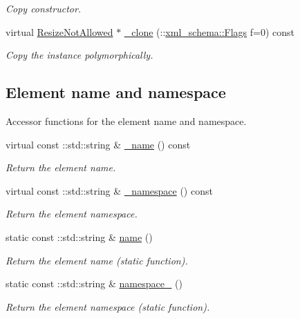 \begin{DoxyCompactItemize}
\begin{DoxyCompactList}\small\item\em Copy constructor. \item\end{DoxyCompactList}\item 
virtual \hyperlink{classopenstack_1_1xml_1_1ResizeNotAllowed}{ResizeNotAllowed} $\ast$ \hyperlink{classopenstack_1_1xml_1_1ResizeNotAllowed_a9f958391e0dc99d0ba1b65af11ad3d72}{\_\-clone} (::\hyperlink{namespacexml__schema_affb4c227cbd9aa7453dd1dc5a1401943}{xml\_\-schema::Flags} f=0) const 
\begin{DoxyCompactList}\small\item\em Copy the instance polymorphically. \item\end{DoxyCompactList}\end{DoxyCompactItemize}
\subsection*{Element name and namespace}
\label{_amgrpd4b5b61f6e07390f4af2465e04571f34}
Accessor functions for the element name and namespace. \begin{DoxyCompactItemize}
\item 
virtual const ::std::string \& \hyperlink{classopenstack_1_1xml_1_1ResizeNotAllowed_a7746acbd1c41f1a37b4c8f8dacba47f5}{\_\-name} () const 
\begin{DoxyCompactList}\small\item\em Return the element name. \item\end{DoxyCompactList}\item 
virtual const ::std::string \& \hyperlink{classopenstack_1_1xml_1_1ResizeNotAllowed_a521203b1158b756ef116ef43c5af5d25}{\_\-namespace} () const 
\begin{DoxyCompactList}\small\item\em Return the element namespace. \item\end{DoxyCompactList}\item 
static const ::std::string \& \hyperlink{classopenstack_1_1xml_1_1ResizeNotAllowed_a5008e129da6acce0b244dacabda1b6db}{name} ()
\begin{DoxyCompactList}\small\item\em Return the element name (static function). \item\end{DoxyCompactList}\item 
static const ::std::string \& \hyperlink{classopenstack_1_1xml_1_1ResizeNotAllowed_a9ebcc32c8043ddba583bc64b9bd53dae}{namespace\_\-} ()
\begin{DoxyCompactList}\small\item\em Return the element namespace (static function). \item\end{DoxyCompactList}\end{DoxyCompactItemize}


